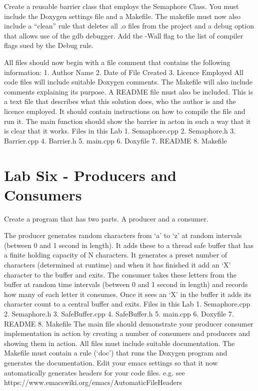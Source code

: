 \documentclass[10pt,a4paper]{article}
\begin{document}
Create a reusable barrier class that employs the Semaphore Class. You must  include the Doxygen settings file and a Makefile.
The makefile must now also include a “clean” rule that deletes all .o files from the project and a debug option that allows use of the gdb debugger. Add the -Wall flag to the list of compiler flags sued by the Debug rule. 

All files should now begin with a file comment that contains the following information:
    1. Author Name
    2. Date of File Created
    3. Licence Employed
All code files will include suitable Doxygen comments.  The Makefile will also include comments explaining its purpose.
A README file must also be included.  This is a text file that describes what this solution does, who the author is and the licence employed.  It should contain instructions on how to compile the file and run it.
The main function should show the barrier in acton in such a way that it is clear that it works.
Files in this Lab
    1. Semaphore.cpp
    2. Semaphore.h
    3. Barrier.cpp
    4. Barrier.h
    5. main.cpp
    6. Doxyfile
    7. README
    8. Makefile

 \section{Lab Six - Producers and Consumers}
 
 
 Create a program that has two parts.  A producer and a consumer.

The producer generates random characters from ‘a’ to ‘z’ at random intervals (between 0 and 1 second in length). It adds these to a thread safe buffer that has a finite holding capacity of N characters. It generates a preset number of characters (determined at runtime) and when it has finished it add an ‘X’ character to the buffer and exits.
The consumer takes these letters from the buffer at random time intervals (between 0 and 1 second in length) and records how many of each letter it consumes. Once it sees an ‘X’ in the buffer it adds its character count to a central buffer and exits.
Files in this Lab
    1. Semaphore.cpp
    2. Semaphore.h
    3. SafeBuffer.cpp
    4. SafeBuffer.h
    5. main.cpp
    6. Doxyfile
    7. README
    8. Makefile
The main file should demonstrate your producer consumer implementation in action by creating a  number of consumers and producers and showing them in action.
All files must include suitable documentation. The Makefile must contain a rule (‘doc’) that runs the Doxygen program and generates the documentation.
Edit your emacs settings so that it now automatically generates headers for your code files.  e.g. see https://www.emacswiki.org/emacs/AutomaticFileHeaders
\end{document}
